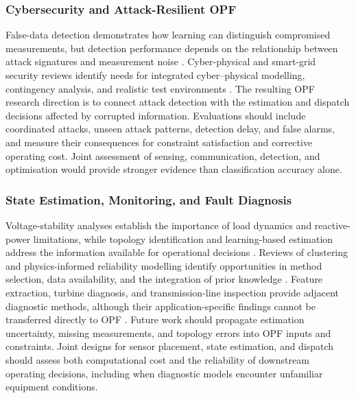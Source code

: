 \documentclass[a4paper,fleqn]{cas-sc}
\begin{document}
\subsubsection{Cybersecurity and Attack-Resilient OPF}\label{subsubsec:gaps_cybersecurity}

False-data detection demonstrates how learning can distinguish compromised measurements, but detection performance depends on the relationship between attack signatures and measurement noise \cite{opfRef037}. Cyber-physical and smart-grid security reviews identify needs for integrated cyber--physical modelling, contingency analysis, and realistic test environments \cite{opfRef067,ghiasi2023comprehensive}. The resulting OPF research direction is to connect attack detection with the estimation and dispatch decisions affected by corrupted information. Evaluations should include coordinated attacks, unseen attack patterns, detection delay, and false alarms, and measure their consequences for constraint satisfaction and corrective operating cost. Joint assessment of sensing, communication, detection, and optimisation would provide stronger evidence than classification accuracy alone.

\subsubsection{State Estimation, Monitoring, and Fault Diagnosis}\label{subsubsec:gaps_state_estimation}

Voltage-stability analyses establish the importance of load dynamics and reactive-power limitations, while topology identification and learning-based estimation address the information available for operational decisions \cite{opfRef002,opfRef003,bolognani2013identification,opfRef053,opfRef072}. Reviews of clustering and physics-informed reliability modelling identify opportunities in method selection, data availability, and the integration of prior knowledge \cite{miraftabzadeh2023k,xu2023physics}. Feature extraction, turbine diagnosis, and transmission-line inspection provide adjacent diagnostic methods, although their application-specific findings cannot be transferred directly to OPF \cite{opfRef027,opfRef049,opfRef080}. Future work should propagate estimation uncertainty, missing measurements, and topology errors into OPF inputs and constraints. Joint designs for sensor placement, state estimation, and dispatch should assess both computational cost and the reliability of downstream operating decisions, including when diagnostic models encounter unfamiliar equipment conditions.
\end{document}
